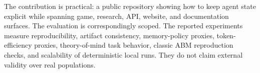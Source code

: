 

The contribution is practical: a public repository showing how to keep agent state explicit while spanning game, research, API, website, and documentation surfaces. The evaluation is correspondingly scoped. The reported experiments measure reproducibility, artifact consistency, memory-policy proxies, token-efficiency proxies, theory-of-mind task behavior, classic ABM reproduction checks, and scalability of deterministic local runs. They do not claim external validity over real populations.
